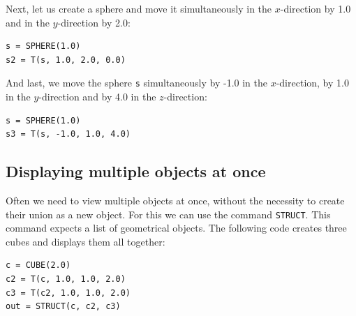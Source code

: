 \noindent
Next, let us create a sphere and move it simultaneously 
in the $x$-direction by 1.0 and in the $y$-direction by 2.0:\\

\begin{bbox}
\begin{verbatim}
s = SPHERE(1.0)
s2 = T(s, 1.0, 2.0, 0.0)
\end{verbatim}
\end{bbox}
\vspace{6mm}

\noindent
And last, we move the sphere {\tt s} simultaneously by -1.0 in the $x$-direction, 
by 1.0 in the $y$-direction and by 4.0 in the $z$-direction:\\

\begin{bbox}
\begin{verbatim}
s = SPHERE(1.0)
s3 = T(s, -1.0, 1.0, 4.0)
\end{verbatim}
\end{bbox}
\vspace{6mm}

\noindent

\subsection{Displaying multiple objects at once} \label{subsec:mo}

Often we need to view multiple objects at once, without 
the necessity to create their union as a new object. For 
this we can use the command {\tt STRUCT}. This command 
expects a list of geometrical objects. The following 
code creates three cubes and displays them all together:\\

\begin{bbox}
\begin{verbatim}
c = CUBE(2.0)
c2 = T(c, 1.0, 1.0, 2.0)
c3 = T(c2, 1.0, 1.0, 2.0)
out = STRUCT(c, c2, c3)
\end{verbatim}
\end{bbox}
\vspace{6mm}

